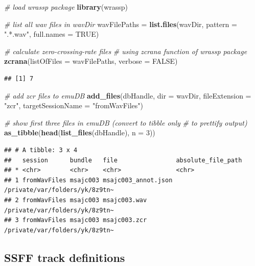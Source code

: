 \documentclass[]{book}
\newenvironment{Shaded}{\begin{snugshade}}{\end{snugshade}}
\newcommand{\CommentTok}[1]{\textcolor[rgb]{0.56,0.35,0.01}{\textit{#1}}}
\newcommand{\DataTypeTok}[1]{\textcolor[rgb]{0.13,0.29,0.53}{#1}}
\newcommand{\DecValTok}[1]{\textcolor[rgb]{0.00,0.00,0.81}{#1}}
\newcommand{\KeywordTok}[1]{\textcolor[rgb]{0.13,0.29,0.53}{\textbf{#1}}}
\newcommand{\NormalTok}[1]{#1}
\newcommand{\OtherTok}[1]{\textcolor[rgb]{0.56,0.35,0.01}{#1}}
\newcommand{\StringTok}[1]{\textcolor[rgb]{0.31,0.60,0.02}{#1}}
\theoremstyle{definition}
\theoremstyle{definition}
\theoremstyle{definition}
\theoremstyle{remark}
\begin{document}
\begin{Shaded}
\begin{Highlighting}[]
\CommentTok{# load wrassp package}
\KeywordTok{library}\NormalTok{(wrassp)}

\CommentTok{# list all wav files in wavDir}
\NormalTok{wavFilePaths =}\StringTok{ }\KeywordTok{list.files}\NormalTok{(wavDir,}
                          \DataTypeTok{pattern =} \StringTok{".*.wav"}\NormalTok{,}
                          \DataTypeTok{full.names =} \OtherTok{TRUE}\NormalTok{)}

\CommentTok{# calculate zero-crossing-rate files}
\CommentTok{# using zcrana function of wrassp package}
\KeywordTok{zcrana}\NormalTok{(}\DataTypeTok{listOfFiles =}\NormalTok{ wavFilePaths,}
       \DataTypeTok{verbose =} \OtherTok{FALSE}\NormalTok{)}
\end{Highlighting}
\end{Shaded}

\begin{verbatim}
## [1] 7
\end{verbatim}

\begin{Shaded}
\begin{Highlighting}[]
\CommentTok{# add zcr files to emuDB}
\KeywordTok{add_files}\NormalTok{(dbHandle,}
          \DataTypeTok{dir =}\NormalTok{ wavDir,}
          \DataTypeTok{fileExtension =} \StringTok{"zcr"}\NormalTok{,}
          \DataTypeTok{targetSessionName =} \StringTok{"fromWavFiles"}\NormalTok{)}

\CommentTok{# show first three files in emuDB (convert to tibble only}
\CommentTok{# to prettify output)}
\KeywordTok{as_tibble}\NormalTok{(}\KeywordTok{head}\NormalTok{(}\KeywordTok{list_files}\NormalTok{(dbHandle), }\DataTypeTok{n =} \DecValTok{3}\NormalTok{))}
\end{Highlighting}
\end{Shaded}

\begin{verbatim}
## # A tibble: 3 x 4
##   session      bundle   file                absolute_file_path            
## * <chr>        <chr>    <chr>               <chr>                         
## 1 fromWavFiles msajc003 msajc003_annot.json /private/var/folders/yk/8z9tn~
## 2 fromWavFiles msajc003 msajc003.wav        /private/var/folders/yk/8z9tn~
## 3 fromWavFiles msajc003 msajc003.zcr        /private/var/folders/yk/8z9tn~
\end{verbatim}

\hypertarget{ssff-track-definitions}{%
\subsection{SSFF track definitions}\label{ssff-track-definitions}}
\end{document}
